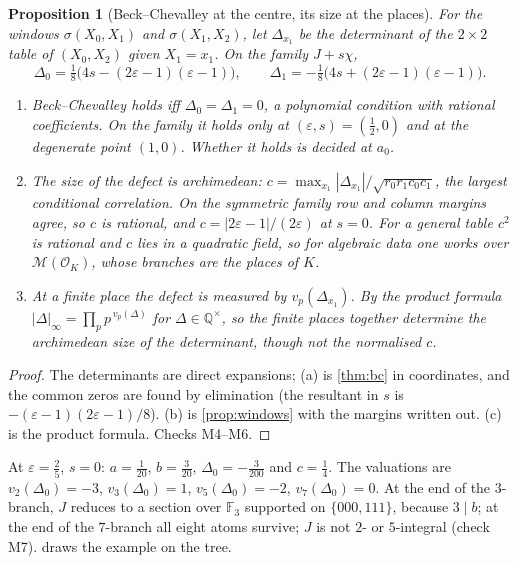 \documentclass[11pt]{article}
\newtheorem{proposition}[theorem]{Proposition}
\theoremstyle{definition}
\begin{document}
\begin{proposition}[Beck--Chevalley at the centre, its size at the places]\label{prop:places-bc}
For the windows $\sigma(X_0,X_1)$ and $\sigma(X_1,X_2)$, let $\Delta_{x_1}$ be the determinant of the $2\times2$ table of $(X_0,X_2)$
given $X_1=x_1$. On the family $J+s\chi$,
\[
\Delta_0=\tfrac18\bigl(4s-(2\varepsilon-1)(\varepsilon-1)\bigr),\qquad \Delta_1=-\tfrac18\bigl(4s+(2\varepsilon-1)(\varepsilon-1)\bigr).
\]
\begin{enumerate}[label=(\alph*)]
\item Beck--Chevalley holds iff $\Delta_0=\Delta_1=0$, a polynomial condition with rational coefficients. On the family it holds only
  at $(\varepsilon,s)=(\tfrac12,0)$ and at the degenerate point $(1,0)$. Whether it holds is decided at $a_0$.
\item The size of the defect is archimedean: $c=\max_{x_1}|\Delta_{x_1}|/\sqrt{r_0r_1c_0c_1}$, the largest conditional correlation.
  On the symmetric family row and column margins agree, so $c$ is rational, and $c=|2\varepsilon-1|/(2\varepsilon)$ at $s=0$. For a
  general table $c^2$ is rational and $c$ lies in a quadratic field, so for algebraic data one works over $\mathcal{M}(\mathcal{O}_K)$,
  whose branches are the places of $K$.
\item At a finite place the defect is measured by $v_p(\Delta_{x_1})$. By the product formula
  $|\Delta|_\infty=\prod_p p^{\,v_p(\Delta)}$ for $\Delta\in\mathbb{Q}^\times$, so the finite places together determine the archimedean
  size of the determinant, though not the normalised $c$.
\end{enumerate}
\end{proposition}
\begin{proof}
The determinants are direct expansions; (a) is \cref{thm:bc} in coordinates, and the common zeros are found by elimination
(the resultant in $s$ is $-(\varepsilon-1)(2\varepsilon-1)/8$). (b) is \cref{prop:windows} with the margins written out. (c) is the
product formula. Checks M4--M6.
\end{proof}

At $\varepsilon=\tfrac25$, $s=0$: $a=\tfrac1{20}$, $b=\tfrac3{20}$, $\Delta_0=-\tfrac3{200}$ and $c=\tfrac14$. The valuations are
$v_2(\Delta_0)=-3$, $v_3(\Delta_0)=1$, $v_5(\Delta_0)=-2$, $v_7(\Delta_0)=0$. At the end of the $3$-branch, $J$ reduces to a section over
$\mathbb{F}_3$ supported on $\{000,111\}$, because $3\mid b$; at the end of the $7$-branch all eight atoms survive; $J$ is not $2$- or
$5$-integral (check M7).  draws the example on the tree.
\end{document}
